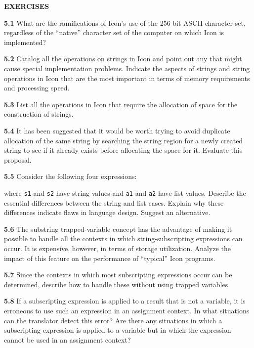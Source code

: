 \bigskip

\noindent\textbf{EXERCISES}

\noindent\textbf{5.1} What are the ramifications of Icon's use of the
256-bit ASCII character set, regardless of the ``native'' character
set of the computer on which Icon is implemented?

\noindent\textbf{5.2} Catalog all the operations on strings in Icon
and point out any that might cause special implementation problems.
Indicate the aspects of strings and string operations in Icon that are
the most important in terms of memory requirements and processing
speed.

\noindent\textbf{5.3} List all the operations in Icon that require the
allocation of space for the construction of strings.

\noindent\textbf{5.4} It has been suggested that it would be worth
trying to avoid duplicate allocation of the same string by searching
the string region for a newly created string to see if it already
exists before allocating the space for it. Evaluate this proposal.

\noindent\textbf{5.5} 
Consider the following four expressions:


\noindent where \texttt{s1} and \texttt{s2} have string values and \texttt{a1}
and \texttt{a2} have list values. Describe the essential differences
between the string and list cases. Explain why these differences
indicate flaws in language design. Suggest an alternative.

\noindent\textbf{5.6} The substring trapped-variable concept has the
advantage of making it possible to handle all the contexts in which
string-subscripting expressions can occur. It is expensive, however,
in terms of storage utilization. Analyze the impact of this feature on
the performance of ``typical'' Icon programs.

\noindent\textbf{5.7} Since the contexts in which most subscripting
expressions occur can be determined, describe how to handle these
without using trapped variables.

\noindent\textbf{5.8} If a subscripting expression is applied to a
result that is not a variable, it is erroneous to use such an
expression in an assignment context. In what situations can the
translator detect this error? Are there any situations in which a
subscripting expression is applied to a variable but in which the
expression cannot be used in an assignment context?

